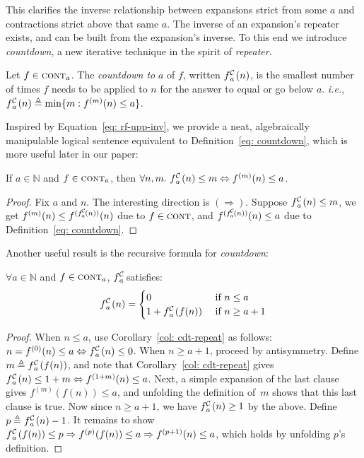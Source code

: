 This clarifies the inverse relationship between expansions strict from some $a$ and contractions strict above that same $a$. The inverse of an expansion's
repeater exists, and can be built from the expansion's inverse.
To this end we introduce \emph{countdown}, a new iterative technique in the
spirit of \emph{repeater}.
\begin{defn} \label{defn: informal-countdown} \label{eq: countdown}
Let $f\in \text{\scshape{cont}}_a$. The \textit{countdown to} $a$ of $f$, written
$\cdt{f}{a}(n)$, is the smallest number of times $f$ needs to be applied to
$n$ for the answer to equal or go below $a$. \emph{i.e.},
$\cdt{f}{a}(n) \triangleq \min\{m: f^{(m)}(n)\le a \}$.
\end{defn}
Inspired by Equation~\ref{eq: rf-upp-inv}, we provide a neat, algebraically manipulable logical sentence equivalent to Definition~\ref{eq: countdown}, which is more useful later in our paper:
\begin{col} \label{col: cdt-repeat}
If $a \in \mathbb{N}$ and $f\in \text{\scshape{cont}}_{a}$, then $\forall n, m.~ \cdt{f}{a}(n)\le m \iff f^{(m)}(n)\le a$.
\end{col}
\begin{proof}
	Fix $a$ and $n$. The interesting direction is $(\Rightarrow)$. Suppose $\cdt{f}{a}(n)\le m$, we get $f^{(m)}(n)\le f^{(\cdt{f}{a}(n))}(n)$ due to $f\in \text{\scshape{cont}}$, and $f^{(\cdt{f}{a}(n))}(n)\le a$ due to Definition~\ref{eq: countdown}.
\end{proof}
Another useful result is the recursive formula for \emph{countdown}:
\begin{thm} \label{thm: cdt-recursion}
	$\forall a\in \mathbb{N}$ and $f\in \text{\scshape{cont}}_{a}$, $\cdt{f}{a}$ satisfies:
	\begin{equation*}
	\cdt{f}{a}(n) = \begin{cases}
	0 & \text{ if } n \le a \\ 1 + \cdt{f}{a}(f(n)) & \text{ if } n \ge a + 1
	\end{cases}
	\end{equation*}
\end{thm}
\begin{proof}
When $n \le a$, use Corollary~\ref{col: cdt-repeat} as follows:
$n = f^{(0)}(n)\le a \iff \cdt{f}{a}(n)\le 0$.
When $n\ge a+1$, proceed by antisymmetry.
Define $m \triangleq \cdt{f}{a}(f(n))$, and note that
Corollary~\ref{col: cdt-repeat} gives
$\cdt{f}{a}(n)\le 1+m \iff f^{(1+m)}(n) \le a$.
Next, a simple expansion of the last clause gives $f^{(m)}(f(n)) \le a$,
and unfolding the definition of~$m$ shows that this last clause is true.
Now since $n\ge a+1$, we have $\cdt{f}{a}(n)\ge 1$ by the above.
Define $p \triangleq \cdt{f}{a}(n) - 1$.
It remains to show $\cdt{f}{a}(f(n))\le p \Rightarrow 
\linebreak f^{(p)}(f(n))\le a \Rightarrow f^{(p+1)}(n)\le a$, which holds by unfolding $p$'s definition.
\end{proof}


